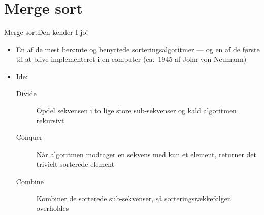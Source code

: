\documentclass{beamer}
\begin{document}
\section{Merge sort}

\begin{frame}{Merge sort}{Den kender I jo!}
    \begin{itemize}
        \item En af de mest berømte og benyttede sorteringsalgoritmer --- og en
            af de første til at blive implementeret i en computer (ca.\ 1945 af
            John von Neumann)
        \item Ide:
            \begin{description}
                \item[Divide] Opdel sekvensen i to lige store sub-sekvenser og kald
                    algoritmen rekursivt
                \item[Conquer] Når algoritmen modtager en sekvens med kun et element,
                    returner det trivielt sorterede element
                \item[Combine] Kombiner de sorterede sub-sekvenser, så
                    sorteringsrækkefølgen overholdes
            \end{description}
    \end{itemize}
\end{frame}
\end{document}
